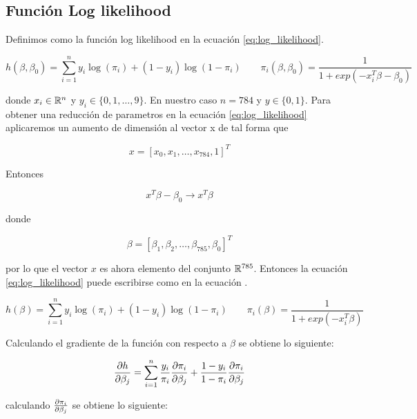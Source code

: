 \subsection{Función Log likelihood}

Definimos como la función log likelihood en la ecuación \ref{eq:log_likelihood}.

\begin{equation}
    h(\beta,\beta_0) = \sum_{i=1}^n y_i \log (\pi_i) +(1-y_i) \log (1-\pi_i) \qquad \pi_i(\beta,\beta_0) =  \frac{1}{1+exp(-x_i^T\beta -\beta_0)} \label{eq:log_likelihood}
\end{equation}

donde $x_i \in \mathbb{R}^n$ y $y_i \in \{0,1,\dots,9\}$. En nuestro caso $n=784$ y $y \in \{0,1\}$. Para obtener una reducción de parametros en la ecuación \ref{eq:log_likelihood} aplicaremos un aumento de dimensión al vector x de tal forma que

\begin{equation*}
    x = [x_0,x_1,\dots,x_{784},1]^T
\end{equation*}

Entonces

\begin{equation*}
    x^T\beta -\beta_0 \rightarrow x^T\beta
\end{equation*}

donde

\begin{equation*}
    \beta = [\beta_1,\beta_2,\dots,\beta_{785},\beta_0]^T
\end{equation*}

por lo que el vector $x$ es ahora elemento del conjunto $\mathbb{R}^{785}$. Entonces la ecuación \ref{eq:log_likelihood} puede escribirse como en la ecuación .

\begin{equation}
    h(\beta) = \sum_{i=1}^n y_i \log (\pi_i) +(1-y_i) \log (1-\pi_i) \qquad \pi_i(\beta) =  \frac{1}{1+exp(-x_i^T\beta)} \label{eq:log_likelihood_2}
\end{equation}


Calculando el gradiente de la función con respecto a $\beta$ se obtiene lo siguiente:

\begin{align*}
    \frac{\partial h}{\partial \beta_j} = \sum_{i=1}^n \frac{y_i}{\pi_i} \frac{\partial \pi_i}{\partial \beta_j} + \frac{1-y_i}{1-\pi_i} \frac{\partial \pi_i}{\partial \beta_j}
\end{align*}

calculando $\frac{\partial \pi_i}{\partial \beta_j}$ se obtiene lo siguiente:

